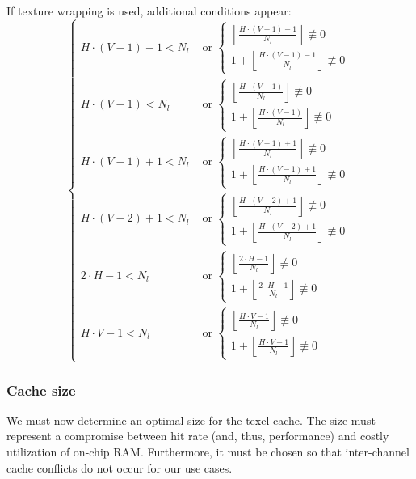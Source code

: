 \documentclass[a4paper,11pt]{kthesis}
\begin{document}
If texture wrapping is used, additional conditions appear:
\begin{equation}\label{eq:icccsumwrap}
\boxed{
\begin{cases}
H \cdot (V-1) - 1 < N_{l} & \textrm{ or } \begin{cases}
\left\lfloor \frac{H \cdot (V-1) - 1}{N_{l}} \right\rfloor \not \equiv 0 \\
1 + \left\lfloor \frac{H \cdot (V-1) - 1}{N_{l}} \right\rfloor \not \equiv 0
\end{cases} \\
H \cdot (V-1) < N_{l} & \textrm{ or } \begin{cases}
\left\lfloor \frac{H \cdot (V-1)}{N_{l}} \right\rfloor \not \equiv 0 \\
1 + \left\lfloor \frac{H \cdot (V-1)}{N_{l}} \right\rfloor \not \equiv 0
\end{cases} \\
H \cdot (V-1) + 1 < N_{l} & \textrm{ or } \begin{cases}
\left\lfloor \frac{H \cdot (V-1) + 1}{N_{l}} \right\rfloor \not \equiv 0 \\
1 + \left\lfloor \frac{H \cdot (V-1) + 1}{N_{l}} \right\rfloor \not \equiv 0
\end{cases} \\
H \cdot (V-2) + 1 < N_{l} & \textrm{ or } \begin{cases}
\left\lfloor \frac{H \cdot (V-2) + 1}{N_{l}} \right\rfloor \not \equiv 0 \\
1 + \left\lfloor \frac{H \cdot (V-2) + 1}{N_{l}} \right\rfloor \not \equiv 0
\end{cases} \\
2 \cdot H - 1 < N_{l} & \textrm{ or } \begin{cases}
\left\lfloor \frac{2 \cdot H - 1}{N_{l}} \right\rfloor \not \equiv 0 \\
1 + \left\lfloor \frac{2 \cdot H - 1}{N_{l}} \right\rfloor \not \equiv 0
\end{cases} \\
H \cdot V - 1 < N_{l} & \textrm{ or } \begin{cases}
\left\lfloor \frac{H \cdot V - 1}{N_{l}} \right\rfloor \not \equiv 0 \\
1 + \left\lfloor \frac{H \cdot V - 1}{N_{l}} \right\rfloor \not \equiv 0
\end{cases}
\end{cases}
}
\end{equation}

\subsubsection{Cache size}
We must now determine an optimal size for the texel cache. The size must represent a compromise between hit rate (and, thus, performance) and costly utilization of on-chip RAM. Furthermore, it must be chosen so that inter-channel cache conflicts do not occur for our use cases.
\end{document}
